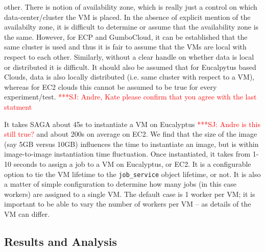 \documentclass[conference,final]{IEEEtran}
\newcommand{\jhanote}[1]{ {\textcolor{red} { ***SJ: #1 }}}
\newcommand{\jhanote}[1]{}
\begin{document}
other. There is notion of availability zone, which is really just a
control on which data-center/cluster the VM is placed. In the absence
of explicit mention of the availabilty zone, it is difficult to
determine or assume that the availability zone is the same. However,
for ECP and GumboCloud, it can be established that the same cluster is
used and thus it is fair to assume that the VMs are local with respect
to each other.  Similarly, without a clear handle on whether data is
local or distributed it is difficult.  It should also be assumed that
for Eucalpytus based Clouds, data is also locally distributed (i.e.
same cluster with respect to a VM), whereas for EC2 clouds this cannot
be assumed to be true for every experiment/test. \jhanote{Andre, Kate
  please confirm that you agree with the last statment}

It takes SAGA about 45s to instantiate a VM on Eucalyptus
\jhanote{Andre is this still true?}  and about 200s on average
on EC2.  We find that the size of the image (say 5GB versus 10GB)
influences the time to instantiate an image, but is within
image-to-image instantiation time fluctuation.  Once instantiated, it
takes from 1-10 seconds to assign a job to a VM on Eucalyptus, or
EC2.  It is a configurable option to tie the VM lifetime to the
\texttt{job\_service} object lifetime, or not.  It is also a matter of
simple configuration to determine how many jobs (in this case workers)
are assigned to a single VM. The default case is 1 worker per VM; it
is important to be able to vary the number of workers per VM -- as
details of the VM can differ.

\subsection{Results and Analysis}
\end{document}

